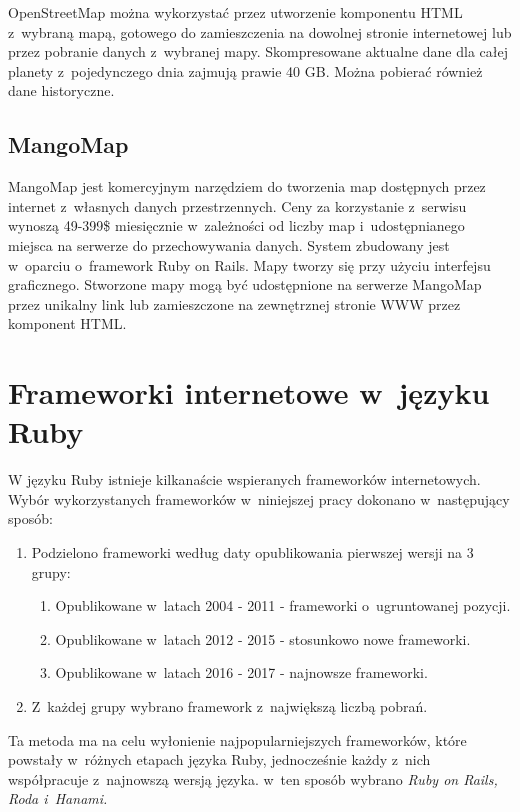 \documentclass[printmode]{mgr}
\begin{document}
  OpenStreetMap można wykorzystać przez utworzenie komponentu HTML z~wybraną mapą, gotowego do zamieszczenia na dowolnej stronie internetowej lub przez pobranie danych z~wybranej mapy. Skompresowane aktualne dane dla całej planety z~pojedynczego dnia zajmują prawie 40 GB. Można pobierać również dane historyczne.

\section{MangoMap}

  MangoMap jest komercyjnym narzędziem do tworzenia map dostępnych przez internet z~własnych danych przestrzennych. Ceny za korzystanie z~serwisu wynoszą 49-399\$ miesięcznie w~zależności od liczby map i~udostępnianego miejsca na serwerze do przechowywania danych. System zbudowany jest w~oparciu o~framework Ruby on Rails. Mapy tworzy się przy użyciu interfejsu graficznego. Stworzone mapy mogą być udostępnione na serwerze MangoMap przez unikalny link lub zamieszczone na zewnętrznej stronie WWW przez komponent HTML. \cite{doc_mango}

\chapter{Frameworki internetowe w~języku Ruby}

W języku Ruby istnieje kilkanaście wspieranych frameworków internetowych. Wybór wykorzystanych frameworków w~niniejszej pracy dokonano w~następujący sposób:
  \begin{enumerate}
    \item Podzielono frameworki według daty opublikowania pierwszej wersji na 3 grupy:
    \begin{enumerate}
      \item Opublikowane w~latach 2004 - 2011 - frameworki o~ugruntowanej pozycji.
      \item Opublikowane w~latach 2012 - 2015 - stosunkowo nowe frameworki.
      \item Opublikowane w~latach 2016 - 2017 - najnowsze frameworki.
    \end{enumerate}
    \item Z~każdej grupy wybrano framework z~największą liczbą pobrań.
  \end{enumerate}
Ta metoda ma na celu wyłonienie najpopularniejszych frameworków, które powstały w~różnych etapach języka Ruby, jednocześnie każdy z~nich współpracuje z~najnowszą wersją języka. w~ten sposób wybrano \emph{Ruby on Rails, Roda i~Hanami.}
\end{document}
